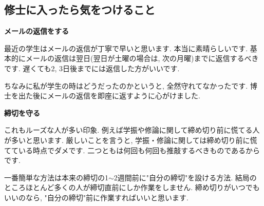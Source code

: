 \subsection{修士に入ったら気をつけること}

\textbf{メールの返信をする}  　\vspace{-6pt} 

最近の学生はメールの返信が丁寧で早いと思います. 本当に素晴らしいです. 
基本的にメールの返信は翌日(翌日が土曜の場合は, 次の月曜)までに返信するべきです. 遅くても2, 3日後までには返信した方がいいです. 

ちなみに私が学生の時はどうだったのかというと, 全然守れてなかったです. 博士を出た後にメールの返信を即座に返すように心がけました. 

\vspace{8pt} 

\textbf{締切を守る}  　\vspace{-6pt} 

これもルーズな人が多い印象. 例えば学振や修論に関して締め切り前に慌てる人が多いと思います. 
厳しいことを言うと, 学振・修論に関しては締め切り前に慌てている時点でダメです. 
二つともは何回も何回も推敲するべきものであるからです.  

一番簡単な方法は本来の締切の1$\sim$2週間前に"自分の締切"を設ける方法. 
結局のところほとんど多くの人が締切直前にしか作業をしません. 締め切りがいつでもいいのなら, "自分の締切"前に作業すればいいと思います. 

\vspace{8pt} 

